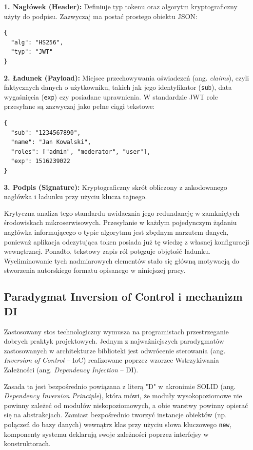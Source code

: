 \documentclass{SGGW-thesis}
\begin{document}
\textbf{1. Nagłówek (Header):} Definiuje typ tokenu oraz algorytm kryptograficzny użyty do podpisu. Zazwyczaj ma postać prostego obiektu JSON:
\begin{verbatim}
{
  "alg": "HS256",
  "typ": "JWT"
}
\end{verbatim}

\textbf{2. Ładunek (Payload):} Miejsce przechowywania oświadczeń (ang. \textit{claims}), czyli faktycznych danych o użytkowniku, takich jak jego identyfikator (\texttt{sub}), data wygaśnięcia (\texttt{exp}) czy posiadane uprawnienia. W standardzie JWT role przesyłane są zazwyczaj jako pełne ciągi tekstowe:
\begin{verbatim}
{
  "sub": "1234567890",
  "name": "Jan Kowalski",
  "roles": ["admin", "moderator", "user"],
  "exp": 1516239022
}
\end{verbatim}

\textbf{3. Podpis (Signature):} Kryptograficzny skrót obliczony z zakodowanego nagłówka i ładunku przy użyciu klucza tajnego.

Krytyczna analiza tego standardu uwidacznia jego redundancję w zamkniętych środowiskach mikroserwisowych. Przesyłanie w każdym pojedynczym żądaniu nagłówka informującego o typie algorytmu jest zbędnym narzutem danych, ponieważ aplikacja odczytująca token posiada już tę wiedzę z własnej konfiguracji wewnętrznej. Ponadto, tekstowy zapis ról potęguje objętość ładunku. Wyeliminowanie tych nadmiarowych elementów stało się główną motywacją do stworzenia autorskiego formatu opisanego w niniejszej pracy.

\subsection{Paradygmat Inversion of Control i mechanizm DI}

Zastosowany stos technologiczny wymusza na programistach przestrzeganie dobrych praktyk projektowych. Jednym z najważniejszych paradygmatów zastosowanych w architekturze biblioteki jest odwrócenie sterowania (ang. \textit{Inversion of Control} -- IoC) realizowane poprzez wzorzec Wstrzykiwania Zależności (ang. \textit{Dependency Injection} -- DI). 

Zasada ta jest bezpośrednio powiązana z literą "D" w akronimie SOLID (ang. \textit{Dependency Inversion Principle}), która mówi, że moduły wysokopoziomowe nie powinny zależeć od modułów niskopoziomowych, a obie warstwy powinny opierać się na abstrakcjach. Zamiast bezpośrednio tworzyć instancje obiektów (np. połączeń do bazy danych) wewnątrz klas przy użyciu słowa kluczowego \texttt{new}, komponenty systemu deklarują swoje zależności poprzez interfejsy w konstruktorach.
\end{document}
